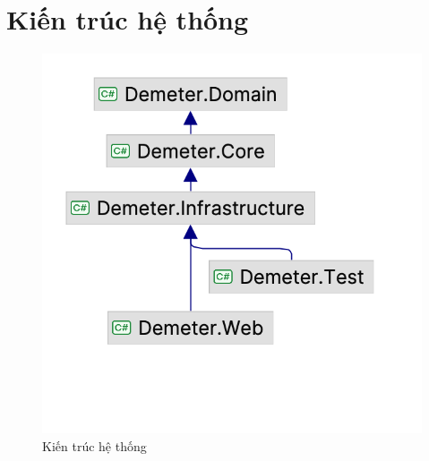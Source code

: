 \section{Kiến trúc hệ thống}
    \begin{figure}[h]
        \centering
        \includegraphics[width=0.6\linewidth]{Images/Demeter.png}
        \caption{Kiến trúc hệ thống}
    \end{figure}


